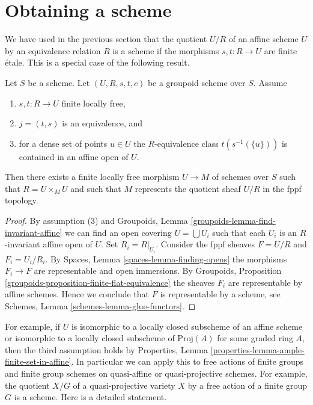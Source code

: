 \section{Obtaining a scheme}
\label{section-getting-a-scheme}

\noindent
We have used in the previous section that the quotient $U/R$ of an
affine scheme $U$ by an equivalence relation $R$ is a scheme if the
morphisms $s, t : R \to U$ are finite \'etale. This is a special case
of the following result.

\begin{proposition}
\label{proposition-finite-flat-equivalence-global}
Let $S$ be a scheme.
Let $(U, R, s, t, c)$ be a groupoid scheme over $S$.
Assume
\begin{enumerate}
\item $s, t : R \to U$ finite locally free,
\item $j = (t, s)$ is an equivalence, and
\item for a dense set of points $u \in U$ the $R$-equivalence class
$t(s^{-1}(\{u\}))$ is contained in an affine open of $U$.
\end{enumerate}
Then there exists a finite locally free morphism $U \to M$
of schemes over $S$ such that $R = U \times_M U$ and such that $M$
represents the quotient sheaf $U/R$ in the fppf topology.
\end{proposition}

\begin{proof}
By assumption (3) and
Groupoids, Lemma \ref{groupoids-lemma-find-invariant-affine}
we can find an open covering $U = \bigcup U_i$ such that each $U_i$
is an $R$-invariant affine open of $U$. Set $R_i = R|_{U_i}$.
Consider the fppf sheaves $F = U/R$ and $F_i = U_i/R_i$.
By Spaces, Lemma \ref{spaces-lemma-finding-opens} the morphisms
$F_i \to F$ are representable and open immersions.
By Groupoids, Proposition \ref{groupoids-proposition-finite-flat-equivalence}
the sheaves $F_i$ are representable by affine schemes. Hence
we conclude that $F$ is representable by a scheme, see
Schemes, Lemma \ref{schemes-lemma-glue-functors}.
\end{proof}

\noindent
For example, if $U$ is isomorphic to a locally closed subscheme of an
affine scheme or isomorphic to a locally closed subscheme of
$\text{Proj}(A)$ for some graded ring $A$, then the third assumption holds by
Properties, Lemma \ref{properties-lemma-ample-finite-set-in-affine}.
In particular we can apply this to free actions of finite groups and
finite group schemes on quasi-affine or quasi-projective schemes.
For example, the quotient $X/G$ of a quasi-projective variety
$X$ by a free action of a finite group $G$ is a scheme. Here is a
detailed statement.

